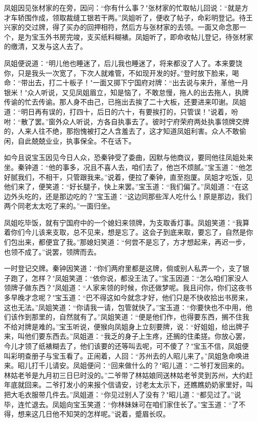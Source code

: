 凤姐因见张材家的在旁，因问：“你有什么事？"张材家的忙取帖儿回说：“就是方才车轿围作成，领取裁缝工银若干两。”凤姐听了，便收了帖子，命彩明登记。待王兴家的交过牌，得了买办的回押相符，然后方与张材家的去领。一面又命念那一个，是为宝玉外书房完竣，支买纸料糊裱。凤姐听了，即命收帖儿登记，待张材家的缴清，又发与这人去了。

凤姐便说道：“明儿他也睡迷了，后儿我也睡迷了，将来都没了人了。本来要饶你，只是我头一次宽了，下次人就难管，不如现开发的好。”登时放下脸来，喝命：“带出去，打二十板子！"一面又掷下宁国府对牌：“出去说与来升，革他一月银米！"众人听说，又见凤姐眉立，知是恼了，不敢怠慢，拖人的出去拖人，执牌传谕的忙去传谕。那人身不由己，已拖出去挨了二十大板，还要进来叩谢。凤姐道：“明日再有误的，打四十，后日的六十，有要挨打的，只管误！"说着，吩咐：“散了罢。”窗外众人听说，方各自执事去了。彼时宁府荣府两处执事领牌交牌的，人来人往不绝，那抱愧被打之人含羞去了，这才知道凤姐利害。众人不敢偷闲，自此兢兢业业，执事保全。不在话下。

如今且说宝玉因见今日人众，恐秦钟受了委曲，因默与他商议，要同他往凤姐处来坐。秦钟道：“他的事多，况且不喜人去，咱们去了，他岂不烦腻。”宝玉道：“他怎好腻我们，不相干，只管跟我来。”说着，便拉了秦钟，直至抱厦。凤姐才吃饭，见他们来了，便笑道：“好长腿子，快上来罢。”宝玉道：“我们偏了。”凤姐道：“在这边外头吃的，还是那边吃的？"宝玉道：“这边同那些浑人吃什么！原是那边，我们两个同老太太吃了来的。”一面归坐。

凤姐吃毕饭，就有宁国府中的一个媳妇来领牌，为支取香灯事。凤姐笑道：“我算着你们今儿该来支取，总不见来，想是忘了。这会子到底来取，要忘了，自然是你们包出来，都便宜了我。”那媳妇笑道：“何尝不是忘了，方才想起来，再迟一步，也领不成了。”说罢，领牌而去。

一时登记交牌。秦钟因笑道：“你们两府里都是这牌，倘或别人私弄一个，支了银子跑了，怎样？"凤姐笑道：“依你说，都没王法了。”宝玉因道：“怎么咱们家没人领牌子做东西？"凤姐道：“人家来领的时候，你还做梦呢。我且问你，你们这夜书多早晚才念呢？"宝玉道：“巴不得这如今就念才好，他们只是不快收拾出书房来，这也无法。”凤姐笑道：“你请我一请，包管就快了。”宝玉道：“你要快也不中用，他们该作到那里的，自然就有了。”凤姐笑道：“便是他们作，也得要东西，搁不住我不给对牌是难的。”宝玉听说，便猴向凤姐身上立刻要牌，说：“好姐姐，给出牌子来，叫他们要东西去。”凤姐道：“我乏的身子上生疼，还搁的住柔搓。你放心罢，今儿才领了纸裱糊去了，他们该要的还等叫去呢，可不傻了？"宝玉不信，凤姐便叫彩明查册子与宝玉看了。正闹着，人回：“苏州去的人昭儿来了。”凤姐急命唤进来。昭儿打千儿请安。凤姐便问：“回来做什么的？"昭儿道：“二爷打发回来的。林姑老爷是九月初三日巳时没的。”二爷带了林姑娘同送林姑老爷灵到苏州，大约赶年底就回来。二爷打发小的来报个信请安，讨老太太示下，还瞧瞧奶奶家里好，叫把大毛衣服带几件去。”凤姐道：“你见过别人了没有？"昭儿道：“都见过了。”说毕，连忙退去。凤姐向宝玉笑道：“你林妹妹可在咱们家住长了。”宝玉道：“了不得，想来这几日他不知哭的怎样呢。”说着，蹙眉长叹。

